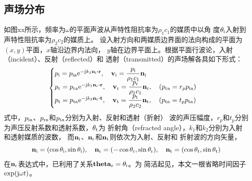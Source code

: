 \documentclass[UTF8]{ctexbook}
\begin{document}
\subsection{声场分布}
如图xx所示，频率为$\omega$的平面声波从声特性阻抗率为$\rho_1c_1$的媒质中以角
度$\theta_\text{i}$入射到声特性阻抗率为$\rho_2c_2$的媒质上。
设入射方向和两媒质边界面的法向构成的平面为$(x,y)$平面，$x$轴沿边界内法向，
$y$轴在边界平面上。根据平面行波论，入射（incident）、反射（reflected）和
透射（transmitted）的声场解各具如下形式：
\begin{equation}
	\label{eq:totalref_pressure}
	\begin{cases}
	p\st{i} = p\st{ia} \me^{-\mj k_1 \vb{n}\st{i} \vdot \vb{r}}
	\qc \vb{v}\st{i} = \dfrac{p\st{i}}{\rho_1c_1} \vb{n}\st{i}\\
	p\st{r} = p\st{ra} \me^{-\mj k_1 \vb{n}\st{r} \vdot \vb{r}}
	\qc \vb{v}\st{r} = \dfrac{p\st{r}}{\rho_1c_1} \vb{n}\st{r}
	\qc (p\st{ra} = r_p p\st{ia}) \\
	p\st{t} = p\st{ta} \me^{-\mj k_2 \vb{n}\st{t} \vdot \vb{t}}
	\qc \vb{v}\st{t} = \dfrac{p\st{t}}{\rho_2c_2} \vb{n}\st{t}
	\qc (p\st{ta} = t_p p\st{ta}) 
	\end{cases}
\end{equation}
式中，$p_\text{ia}$、$p_\text{ra}$和$p_\text{ta}$分别为入射、反射和透射（折射）
波的声压幅度，$r_p$和$t_p$分别为声压反射系数和透射系数，$\theta_\text{t}$为
折射角（refracted angle），$k_1$和$k_2$分别为入射和透射媒质的波数，
而$\vb{n}_\text{i}$、$\vb{n}_\text{r}$和$\vb{n}_\text{t}$则依次为入射、反射和
折射波的方向矢量，
\begin{equation}
	\label{eq:totalref_n}
	\vb{n}\st{i}=(\cos \theta\st{i}, \sin \theta\st{i})\qc 
	\vb{n}\st{r}=(-\cos \theta\st{r}, \sin \theta\st{r})\qc 
	\vb{n}\st{t}=(\cos \theta\st{t}, \sin \theta\st{t})
\end{equation}
在$\vb{n}_\text{r}$表达式中，已利用了关系$\vb{theta}_\text{r}=\theta_\text{i}$。为
简洁起见，本文一根省略时间因子$\exp(\mathrm{j} \omega t)$。
\end{document}
